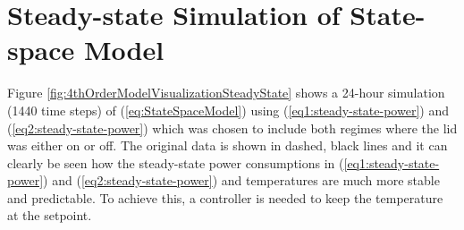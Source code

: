 \documentclass[sigconf]{acmart}
\begin{document}
\section{Steady-state Simulation of State-space Model}\label{app:steady-state-simulation}


Figure \ref{fig:4thOrderModelVisualizationSteadyState} shows a 24-hour simulation (1440 time steps) of (\ref{eq:StateSpaceModel}) using (\ref{eq1:steady-state-power}) and (\ref{eq2:steady-state-power}) which was chosen to include both regimes where the lid was either on or off. The original data is shown in dashed, black lines and it can clearly be seen how the steady-state power consumptions in (\ref{eq1:steady-state-power}) and (\ref{eq2:steady-state-power}) and temperatures are much more stable and predictable. To achieve this, a controller is needed to keep the temperature at the setpoint.
\end{document}
